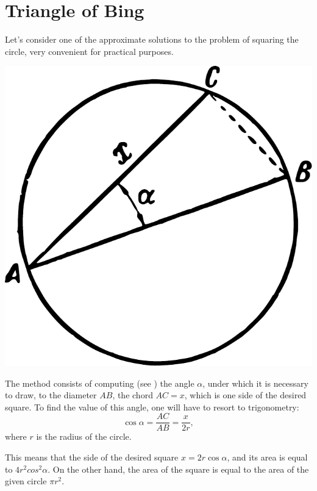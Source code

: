 \section{Triangle of Bing}
\label{sec-9.7}

Let's consider one of the approximate solutions to the problem of squaring the circle, very convenient for practical purposes.

\begin{marginfigure}
\centering
\includegraphics[width=\textwidth]{figures/ch-09/fig-126.pdf}
\end{marginfigure}


The method consists of computing (see ) the angle $\alpha$, under which it is necessary to draw, to the diameter $AB$, the chord $AC = x$, which is one side of the desired square. To find the value of this angle, one will have to resort to trigonometry:
\begin{equation*}%
\cos \alpha = \frac{AC}{AB} = \frac{x}{2r},
\end{equation*}
where $r$ is the radius of the circle.

This means that the side of the desired square $x = 2r \cos \alpha$, and its area is equal to $4r^{2} cos^{2} \alpha$. On the other hand, the area of the square is equal to the area of the given circle $\pi r^{2}$.

